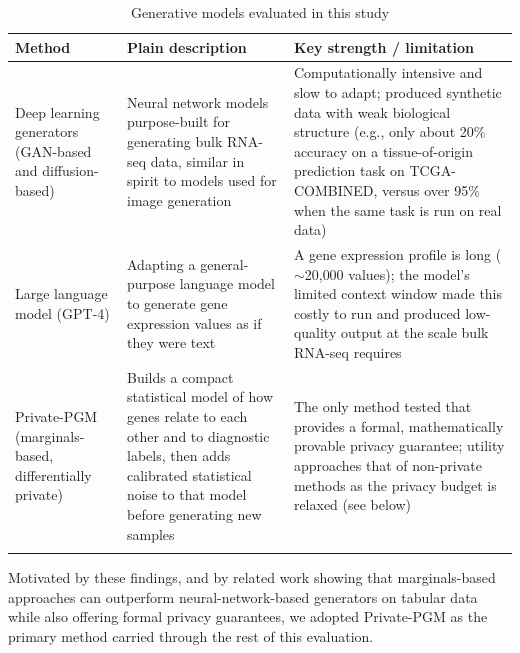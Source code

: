 \documentclass[webpdf,contemporary,large]{oup-authoring-template}%
\theoremstyle{thmstyleone}%
\theoremstyle{thmstyletwo}%
\theoremstyle{thmstylethree}%
\begin{document}
\begin{table}[!t]
\caption{Generative models evaluated in this study\label{tab:models}}
\begin{tabular}{L{3.5cm} L{4.5cm} L{5.5cm}}
  \toprule
  \textbf{Method} & \textbf{Plain description} & \textbf{Key strength / limitation} \\
  \midrule
  Deep learning generators (GAN-based and diffusion-based) &
    Neural network models purpose-built for generating bulk RNA-seq data,
    similar in spirit to models used for image generation &
    Computationally intensive and slow to adapt; produced synthetic data
    with weak biological structure (e.g., only about 20\% accuracy on a
    tissue-of-origin prediction task on TCGA-COMBINED, versus over 95\%
    when the same task is run on real data) \\
  Large language model (GPT-4) &
    Adapting a general-purpose language model to generate gene expression
    values as if they were text &
    A gene expression profile is long ($\sim$20{,}000 values); the
    model's limited context window made this costly to run and produced
    low-quality output at the scale bulk RNA-seq requires \\
  Private-PGM (marginals-based, differentially private) &
    Builds a compact statistical model of how genes relate to each other
    and to diagnostic labels, then adds calibrated statistical noise to
    that model before generating new samples &
    The only method tested that provides a formal, mathematically
    provable privacy guarantee; utility approaches that of non-private
    methods as the privacy budget is relaxed (see below) \\
  \botrule
\end{tabular}
\end{table}

Motivated by these findings, and by related work showing that marginals-based approaches can outperform neural-network-based generators on tabular data while also offering formal privacy guarantees, we adopted Private-PGM \citep{mckenna2019graphical} as the primary method carried through the rest of this evaluation.
\end{document}
